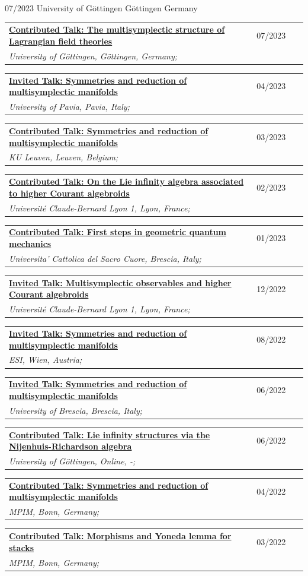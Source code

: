 \documentclass[a4paper]{article}
\newcommand{\longvoice}[8]{
	\begin{tabular}{p{0.83\linewidth} p{0.17\linewidth} }
		\textbf{\href{#3}{#2: #1}} & #4 
		\\ 
		\textit{#5, #6, #7;} & {\small\emph{#8}}
	\end{tabular}
	\vspace{.5em}
}
\begin{document}
		{07/2023}
		{University of Göttingen}
		{Göttingen}
		{Germany}
		{}
	\longvoice{The multisymplectic structure of Lagrangian field theories}
		{Contributed Talk}
		{https://www.dropbox.com/s/lsaqjhq6g0rmagw/2307-Gottingen-MsLFT.pdf?dl=0}
		{07/2023}
		{University of Göttingen}
		{Göttingen}
		{Germany}
		{}
	\longvoice{Symmetries and reduction of multisymplectic manifolds}
		{Invited Talk}
		{https://mathematicalphysicspavia.wordpress.com/2023/04/04/antonio-michele-miti-28-04-2023-symmetries-and-reduction-of-multisymplectic-manifoldsantonio-michele-miti/}
		{04/2023}
		{University of Pavia}
		{Pavia}
		{Italy}
		{}
	\longvoice{Symmetries and reduction of multisymplectic manifolds}
		{Contributed Talk}
		{https://wis.kuleuven.be/events/young-researchers-workshop2023/abstractsforcontributedtalks}
		{03/2023}
		{KU Leuven}
		{Leuven}
		{Belgium}
		{}
	\longvoice{On the Lie infinity algebra associated to higher Courant algebroids}
		{Contributed Talk}
		{https://www.dropbox.com/s/whusmg6kj8dbqd7/2302-Lyon-HigherGeoWorkgroup.pdf?dl=0}
		{02/2023}
		{Université Claude-Bernard Lyon 1}
		{Lyon}
		{France}
		{}
	\longvoice{First steps in geometric quantum mechanics}
		{Contributed Talk}
		{https://www.dropbox.com/s/oqd6psmeiexwhnt/2301-Brescia-PhdSeminar.pdf?dl=0}
		{01/2023}
		{Universita' Cattolica del Sacro Cuore}
		{Brescia}
		{Italy}
		{}
	\longvoice{Multisymplectic observables and higher Courant algebroids}
		{Invited Talk}
		{https://indico.math.cnrs.fr/event/8621/}
		{12/2022}
		{Université Claude-Bernard Lyon 1}
		{Lyon}
		{France}
		{}
	\longvoice{Symmetries and reduction of multisymplectic manifolds}
		{Invited Talk}
		{https://www.esi.ac.at/events/t1028/}
		{08/2022}
		{ESI}
		{Wien}
		{Austria}
		{}
	\longvoice{Symmetries and reduction of multisymplectic manifolds}
		{Invited Talk}
		{https://www.dropbox.com/s/2elzcczx7m0o9zf/2206-Brescia-YoungPeople4Math.pdf?dl=0}
		{06/2022}
		{University of Brescia}
		{Brescia}
		{Italy}
		{}
	\longvoice{Lie infinity structures via the Nijenhuis-Richardson algebra}
		{Contributed Talk}
		{https://www.dropbox.com/s/lq862vynwme0eyn/2206-Online-GoodMorningSfars.pdf?dl=0}
		{06/2022}
		{University of Göttingen}
		{Online}
		{-}
		{}
	\longvoice{Symmetries and reduction of multisymplectic manifolds}
		{Contributed Talk}
		{https://www.mpim-bonn.mpg.de/node/11285}
		{04/2022}
		{MPIM}
		{Bonn}
		{Germany}
		{}
	\longvoice{Morphisms and Yoneda lemma for stacks}
		{Contributed Talk}
		{https://www.dropbox.com/s/rfu7cw1plq0wpzb/2203-Bonn-StackMorphisms.pdf?dl=0}
		{03/2022}
		{MPIM}
		{Bonn}
		{Germany}
		{}
\end{document}
